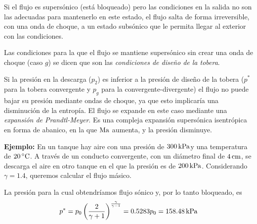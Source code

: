 	
	Si el flujo es supersónico (está bloqueado) pero las condiciones en
	la salida no son las adecuadas para mantenerlo en este estado, el
	flujo salta de forma irreversible, con una onda de choque, a un estado
	subsónico que le permita llegar al exterior con las condiciones.
	
	Las condiciones para la que el flujo se mantiene supersónico sin crear
	una onda de choque (caso $g$) se dicen que son las \emph{condiciones
		de diseño de la tobera}.
	
	\begin{center}
		\par\end{center}
	
	
	Si la presión en la descarga ($p_{2}$) es inferior a la presión de
	diseño de la tobera ($p^{*}$para la tobera convergente y $p_{g}$
	para la convergente-divergente) el flujo no puede bajar su presión
	mediante ondas de choque, ya que esto implicaría una disminución de
	la entropía. El flujo se expande en este caso mediante una \emph{expansión
		de Prandtl-Meyer}. Es una compleja expansión supersónica isentrópica
	en forma de abanico, en la que $\text{Ma}$ aumenta, y la presión disminuye.

	
	\textbf{Ejemplo:}
		En un tanque hay aire con una presión de $\unit[300]{kPa}$y una
		temperatura de $\unit[20]{^{\circ}C}$. A través de un conducto convergente,
		con un diámetro final de $\unit[4]{cm}$, se descarga el aire en otro
		tanque en el que la presión es de $\unit[200]{kPa}$. Considerando
		$\gamma=1.4$, queremos calcular el flujo másico.
		
		La presión para la cual obtendríamos flujo sónico y, por lo tanto
		bloqueado, es
		\[
		p^{*}=p_{0}\left(\frac{2}{\gamma+1}\right)^{\frac{\gamma}{\gamma-1}}=0.5283p_{0}=\unit[158.48]{kPa}
		\]
		
